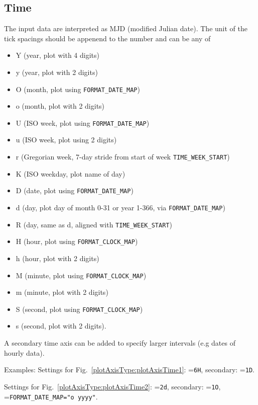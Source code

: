 \subsection{Time}
The input data are interpreted as MJD (modified Julian date).
The unit of the tick spacings should be appenend to the number and can be any of
\begin{itemize}
\item Y (year, plot with 4 digits)
\item y (year, plot with 2 digits)
\item O (month, plot using \verb|FORMAT_DATE_MAP|)
\item o (month, plot with 2 digits)
\item U (ISO week, plot using \verb|FORMAT_DATE_MAP|)
\item u (ISO week, plot using 2 digits)
\item r (Gregorian week, 7-day stride from start of week \verb|TIME_WEEK_START|)
\item K (ISO weekday, plot name of day)
\item D (date, plot using \verb|FORMAT_DATE_MAP|)
\item d (day, plot day of month 0-31 or year 1-366, via \verb|FORMAT_DATE_MAP|)
\item R (day, same as d, aligned with \verb|TIME_WEEK_START|)
\item H (hour, plot using \verb|FORMAT_CLOCK_MAP|)
\item h (hour, plot with 2 digits)
\item M (minute, plot using \verb|FORMAT_CLOCK_MAP|)
\item m (minute, plot with 2 digits)
\item S (second, plot using \verb|FORMAT_CLOCK_MAP|)
\item s (second, plot with 2 digits).
\end{itemize}

A secondary time axis can be added to specify larger intervals (e.g dates of hourly data).

Examples: Settings for Fig.~\ref{plotAxisType:plotAxisTime1}: =\verb|6H|, secondary: =\verb|1D|.

Settings for Fig.~\ref{plotAxisType:plotAxisTime2}: =\verb|2d|, secondary: =\verb|1O|, =\verb|FORMAT_DATE_MAP="o yyyy"|.

